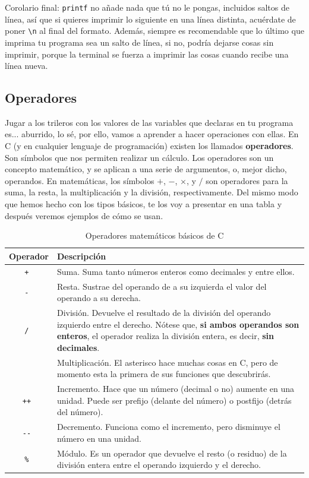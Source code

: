 \documentclass[a4paper]{article}
\begin{document}
Corolario final: \texttt{printf} no añade nada que tú no le pongas, incluidos
saltos de línea, así que si quieres imprimir lo siguiente en una línea distinta,
acuérdate de poner \verb!\n! al final del formato. Además, siempre es
recomendable que lo último que imprima tu programa sea un salto de línea, si no,
podría dejarse cosas sin imprimir, porque la terminal se fuerza a imprimir las
cosas cuando recibe una línea nueva.

\subsection{Operadores}
Jugar a los trileros con los valores de las variables que declaras en
tu programa es... aburrido, lo sé, por ello, vamos a aprender a hacer
operaciones con ellas.
En C (y en cualquier lenguaje de programación) existen los llamados
\textbf{operadores}. Son símbolos que nos permiten realizar un cálculo.
Los operadores son un concepto matemático, y se aplican a una
serie de argumentos, o, mejor dicho, operandos. En
matemáticas, los símbolos $+$, $-$, $\times$, y $/$ son
operadores para la suma, la resta, la multiplicación y la división,
respectivamente.
Del mismo modo que hemos hecho con los tipos básicos, te los
voy a presentar en una tabla y después veremos ejemplos de cómo se usan.

\begin{table}[H]
\centering
\begin{tabularx}{\linewidth}{|c|Y|}
\hline
\bf Operador & \bf Descripción \\ \hline
\tt + & Suma. Suma tanto números enteros como decimales y entre ellos. \\\hline
\tt - & Resta. Sustrae del operando de a su izquierda el valor del operando a su derecha. \\\hline
\tt / & División. Devuelve el resultado de la división del operando izquierdo entre el derecho. Nótese que, \textbf{si ambos operandos son enteros}, el operador realiza la división entera, es decir, \textbf{sin decimales}. \\\hline
\tt * & Multiplicación. El asterisco hace muchas cosas en C, pero de momento esta la primera de sus funciones que descubrirás. \\\hline
\tt ++ & Incremento. Hace que un número (decimal o no) aumente en una unidad. Puede ser prefijo (delante del número) o postfijo (detrás del número). \\\hline
\tt -{}- & Decremento. Funciona como el incremento, pero disminuye el número en una unidad. \\\hline
\tt \% & Módulo. Es un operador que devuelve el resto (o residuo) de la división entera entre el operando izquierdo y el derecho. \\\hline
\end{tabularx}
\caption{Operadores matemáticos básicos de C}
\label{tab:mathOperators}
\end{table}
\end{document}
